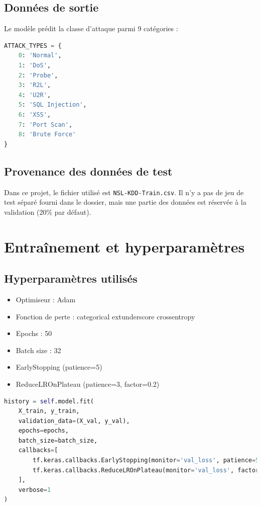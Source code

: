 \documentclass[a4paper,12pt]{article}
\begin{document}
\subsection{Données de sortie}
Le modèle prédit la classe d'attaque parmi 9 catégories :
\begin{lstlisting}[language=Python]
ATTACK_TYPES = {
    0: 'Normal',
    1: 'DoS',
    2: 'Probe',
    3: 'R2L',
    4: 'U2R',
    5: 'SQL Injection',
    6: 'XSS',
    7: 'Port Scan',
    8: 'Brute Force'
}
\end{lstlisting}

\subsection{Provenance des données de test}
Dans ce projet, le fichier utilisé est \texttt{NSL-KDD-Train.csv}. Il n'y a pas de jeu de test séparé fourni dans le dossier, mais une partie des données est réservée à la validation (20\% par défaut).

\section{Entraînement et hyperparamètres}

\subsection{Hyperparamètres utilisés}
\begin{itemize}
  \item Optimiseur : Adam
  \item Fonction de perte : categorical	extunderscore crossentropy
  \item Epochs : 50
  \item Batch size : 32
  \item EarlyStopping (patience=5)
  \item ReduceLROnPlateau (patience=3, factor=0.2)
\end{itemize}

\begin{lstlisting}[language=Python]
history = self.model.fit(
    X_train, y_train,
    validation_data=(X_val, y_val),
    epochs=epochs,
    batch_size=batch_size,
    callbacks=[
        tf.keras.callbacks.EarlyStopping(monitor='val_loss', patience=5, restore_best_weights=True),
        tf.keras.callbacks.ReduceLROnPlateau(monitor='val_loss', factor=0.2, patience=3, min_lr=1e-6)
    ],
    verbose=1
)
\end{lstlisting}
\end{document}
